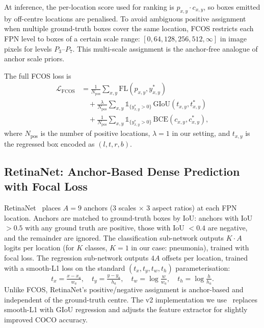 \documentclass[11pt,a4paper]{article}
\begin{document}
\pagebreak

At inference, the per-location score used for ranking is $p_{x,y} \cdot c_{x,y}$, so boxes emitted by off-centre locations are penalised. To avoid ambiguous positive assignment when multiple ground-truth boxes cover the same location, FCOS restricts each FPN level to boxes of a certain scale range: $[0, 64, 128, 256, 512, \infty]$ in image pixels for levels $P_3$--$P_7$. This multi-scale assignment is the anchor-free analogue of anchor scale priors.

The full FCOS loss is
\begin{equation}
\begin{aligned}
    \mathcal{L}_{\text{FCOS}} &= \frac{1}{N_{\text{pos}}} \sum_{x,y} \mathrm{FL}(p_{x,y}, y^{\ast}_{x,y}) \\
    &\quad + \frac{\lambda}{N_{\text{pos}}} \sum_{x,y} \mathbb{1}_{\{y^{\ast}_{x,y} > 0\}} \,\mathrm{GIoU}\!\left(t_{x,y}, t^{\ast}_{x,y}\right) \\
    &\quad + \frac{1}{N_{\text{pos}}} \sum_{x,y} \mathbb{1}_{\{y^{\ast}_{x,y} > 0\}} \,\mathrm{BCE}(c_{x,y}, c^{\ast}_{x,y}),
\end{aligned}
\end{equation}
where $N_{\text{pos}}$ is the number of positive locations, $\lambda = 1$ in our setting, and $t_{x,y}$ is the regressed box encoded as $(l, t, r, b)$.

\subsection{RetinaNet: Anchor-Based Dense Prediction with Focal Loss}

RetinaNet~\cite{lin2017focal} places $A = 9$ anchors (3 scales $\times$ 3 aspect ratios) at each FPN location. Anchors are matched to ground-truth boxes by IoU: anchors with IoU $> 0.5$ with any ground truth are positive, those with IoU $<0.4$ are negative, and the remainder are ignored. The classification sub-network outputs $K \cdot A$ logits per location (for $K$ classes, $K=1$ in our case: pneumonia), trained with focal loss. The regression sub-network outputs $4A$ offsets per location, trained with a smooth-L1 loss on the standard $(t_x, t_y, t_w, t_h)$ parameterisation:
\begin{equation}
    t_x = \tfrac{x - x_a}{w_a}, \quad
    t_y = \tfrac{y - y_a}{h_a}, \quad
    t_w = \log\tfrac{w}{w_a}, \quad
    t_h = \log\tfrac{h}{h_a}.
\end{equation}
Unlike FCOS, RetinaNet's positive/negative assignment is anchor-based and independent of the ground-truth centre. The v2 implementation we use~\cite{li2021benchmarking} replaces smooth-L1 with GIoU regression and adjusts the feature extractor for slightly improved COCO accuracy.
\end{document}
